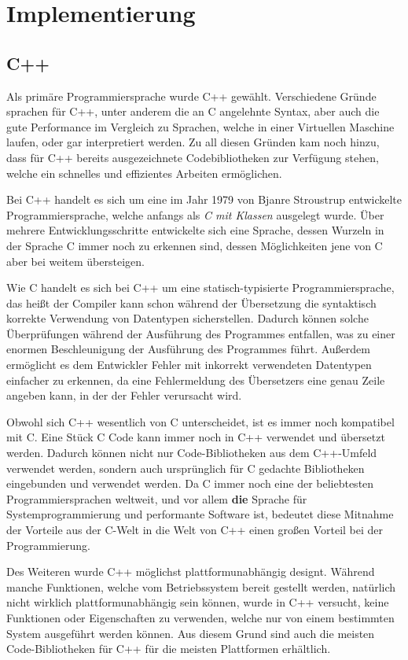 \section{Implementierung}

\subsection{C++}
Als primäre Programmiersprache wurde C++ gewählt. Verschiedene Gründe sprachen für C++, unter anderem die an C angelehnte Syntax, aber
auch die gute Performance im Vergleich zu Sprachen, welche in einer Virtuellen Maschine laufen, oder gar interpretiert werden. Zu 
all diesen Gründen kam noch hinzu, dass für C++ bereits ausgezeichnete Codebibliotheken zur Verfügung stehen, welche ein schnelles
und effizientes Arbeiten ermöglichen.

Bei C++ handelt es sich um eine im Jahr 1979 von Bjanre Stroustrup entwickelte Programmiersprache, welche anfangs als \textit{C mit Klassen}
ausgelegt wurde. Über mehrere Entwicklungsschritte entwickelte sich eine Sprache, dessen Wurzeln in der Sprache C immer noch zu erkennen sind, 
dessen Möglichkeiten jene von C aber bei weitem übersteigen. 

Wie C handelt es sich bei C++ um eine statisch-typisierte Programmiersprache, das heißt der Compiler kann schon während der Übersetzung die
syntaktisch korrekte Verwendung von Datentypen sicherstellen. Dadurch können solche Überprüfungen während der Ausführung des Programmes
entfallen, was zu einer enormen Beschleunigung der Ausführung des Programmes führt. Außerdem ermöglicht es dem Entwickler Fehler mit
inkorrekt verwendeten Datentypen einfacher zu erkennen, da eine Fehlermeldung des Übersetzers eine genau Zeile angeben kann, in der 
der Fehler verursacht wird. 

Obwohl sich C++ wesentlich von C unterscheidet, ist es immer noch kompatibel mit C. Eine Stück C Code kann immer noch in C++ verwendet und
übersetzt werden. Dadurch können nicht nur Code-Bibliotheken aus dem C++-Umfeld verwendet werden, sondern auch ursprünglich für C gedachte
Bibliotheken eingebunden und verwendet werden. Da C immer noch eine der beliebtesten Programmiersprachen weltweit, und vor allem \textbf{die}
Sprache für Systemprogrammierung und performante Software ist, bedeutet diese Mitnahme der Vorteile aus der C-Welt in die Welt von C++
einen großen Vorteil bei der Programmierung.

Des Weiteren wurde C++ möglichst plattformunabhängig designt. Während manche Funktionen, welche vom Betriebssystem bereit gestellt werden, 
natürlich nicht wirklich plattformunabhängig sein können, wurde in C++ versucht, keine Funktionen oder Eigenschaften zu verwenden, welche
nur von einem bestimmten System ausgeführt werden können. Aus diesem Grund sind auch die meisten Code-Bibliotheken für C++ für die meisten
Plattformen erhältlich. 

